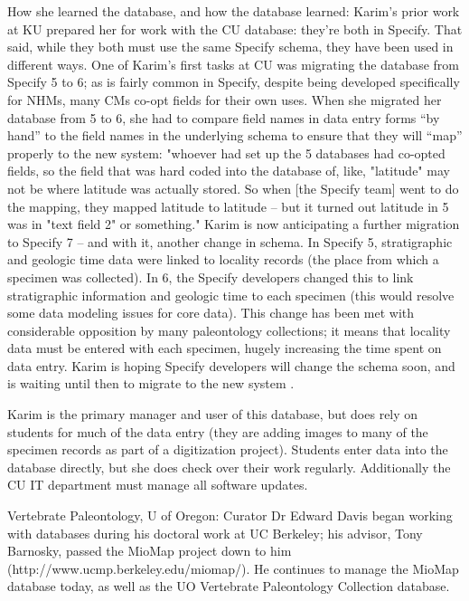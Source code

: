 How she learned the database, and how the database learned: Karim’s prior work at KU prepared her for work with the CU database: they’re both in Specify.  That said, while they both must use the same Specify schema, they have been used in different ways.  One of Karim’s first tasks at CU was migrating the database from Specify 5 to 6; as is fairly common in Specify, despite being developed specifically for NHMs, many CMs co-opt fields for their own uses. When she migrated her database from 5 to 6, she had to compare field names in data entry forms “by hand” to the field names in the underlying schema to ensure that they will “map” properly to the new system: 
"whoever had set up the 5 databases had co-opted fields, so the field that was hard coded into the database of, like, "latitude" may not be where latitude was actually stored.  So when [the Specify team] went to do the mapping, they mapped latitude to latitude -- but it turned out latitude in 5 was in "text field 2" or something." 
Karim is now anticipating a further migration to Specify 7 – and with it, another change in schema. In Specify 5, stratigraphic and geologic time data were linked to locality records (the place from which a specimen was collected).  In 6, the Specify developers changed this to link stratigraphic information and geologic time to each specimen (this would resolve some data modeling issues for core data).  This change has been met with considerable opposition by many paleontology collections; it means that locality data must be entered with each specimen, hugely increasing the time spent on data entry. Karim is hoping Specify developers will change the schema soon, and is waiting until then to migrate to the new system .  

Karim is the primary manager and user of this database, but does rely on students for much of the data entry (they are adding images to many of the specimen records as part of a digitization project).  Students enter data into the database directly, but she does check over their work regularly. Additionally the CU IT department must manage all software updates.

Vertebrate Paleontology, U of Oregon: Curator Dr Edward Davis began working with databases during his doctoral work at UC Berkeley; his advisor, Tony Barnosky, passed the MioMap project down to him (http://www.ucmp.berkeley.edu/miomap/).  He continues to manage the MioMap database today, as well as the UO Vertebrate Paleontology Collection database.

